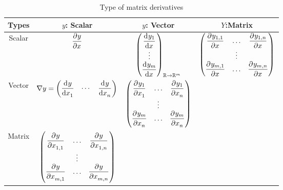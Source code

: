 \begin{table}[ht]
\centering
\renewcommand*{\arraystretch}{1}
\begin{tabular}[t]{c|c|c|c}
\hline
Types & $y$: Scalar & ${y}$: Vector & $Y$:Matrix \\
\hline
Scalar & $\dpd{y}{x}$ & $\begin{pmatrix}
    \dod{y_1}{x} \\
    \vdots \\
    \dod{y_m}{x}
\end{pmatrix}_{\realset \rightarrow \realset^m} $ & $\begin{pmatrix}
            \dpd{y_{1,1}}{x} & \hdots & \dpd{y_{1,n}}{x} \\
            & \vdots \\
            \dpd{y_{m,1}}{x} & \hdots & \dpd{y_{m,n}}{x}
        \end{pmatrix}$ \\[4ex]
Vector & $\nabla y = \begin{pmatrix}
    \dod{y}{x_1} & \cdots & \dod{y}{x_n}
\end{pmatrix}$ & $\begin{pmatrix}
            \dpd{y_1}{x_1} & \hdots & \dpd{y_1}{x_n} \\
            & \vdots \\
            \dpd{y_m}{x_n} & \hdots & \dpd{y_m}{x_n}
        \end{pmatrix}$ &  \\[4ex]
Matrix & $\begin{pmatrix}
            \dpd{y}{x_{1,1}} & \hdots & \dpd{y}{x_{1,n}} \\
            & \vdots \\
            \dpd{y}{x_{m,1}} & \hdots & \dpd{y}{x_{m,n}}
        \end{pmatrix}$ &   & \\[4ex]
\end{tabular}
\caption{Type of matrix derivatives}
\end{table}



